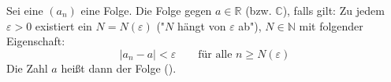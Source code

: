 Sei eine $(a_n)$ eine Folge. Die Folge  gegen $a \in \mathbb{R}$ (bzw. $\mathbb{C}$), falls gilt:
Zu jedem $\varepsilon > 0$ existiert ein $N = N(\varepsilon)$ ("$N$ hängt von $\varepsilon$ ab"), $N \in \mathbb{N}$ mit folgender Eigenschaft:
$$|a_n - a| < \varepsilon \qquad \text{für alle $n \geq N(\varepsilon)$}$$
Die Zahl $a$ heißt dann  der Folge ().